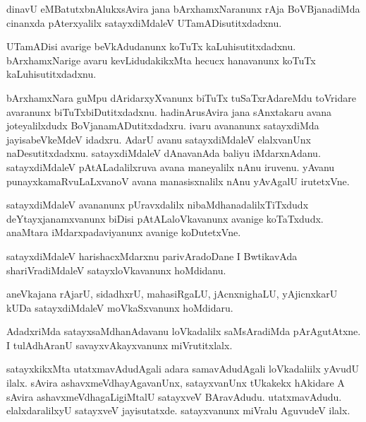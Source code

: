 \documentclass{article}
\begin{document}
\begin{mng}%
dinavU eMBatutxbnAlukxsAvira jana bArxhamxNaranunx rAja BoVBjanadiMda
cinanxda pAterxyalilx satayxdiMdaleV UTamADisutitxdadxnu.
\end{mng}

\begin{mng}%
UTamADisi avarige beVkAdudanunx koTuTx kaLuhisutitxdadxnu.
bArxhamxNarige avaru kevLidudakikxMta hecucx hanavanunx koTuTx kaLuhisutitxdadxnu.
\end{mng}

\begin{mng}%
bArxhamxNara guMpu dAridarxyXvanunx biTuTx tuSaTxrAdareMdu
toVridare avaranunx biTuTxbiDutitxdadxnu. hadinArusAvira jana sAnxtakaru
avana joteyalilxdudx BoVjanamADutitxdadxru. ivaru avananunx satayxdiMda
jayisabeVkeMdeV idadxru. AdarU avanu satayxdiMdaleV elalxvanUnx naDesutitxdadxnu. satayxdiMdaleV dAnavanAda baliyu iMdarxnAdanu. satayxdiMdaleV
pAtALadalilxruva avana maneyalilx nAnu iruvenu. yAvanu punayxkamaRvuLaLxvanoV
avana manasisxnalilx nAnu yAvAgalU irutetxVne.
\end{mng}

\begin{mng}%
satayxdiMdaleV avananunx pUravxdalilx nibaMdhanadalilxTiTxdudx deYtayxjanamxvanunx
biDisi pAtALaloVkavanunx avanige koTaTxdudx. anaMtara iMdarxpadaviyanunx avanige koDutetxVne.
\end{mng}

\begin{mng}%
satayxdiMdaleV harishacxMdarxnu parivAradoDane I BwtikavAda
shariVradiMdaleV satayxloVkavanunx hoMdidanu.
\end{mng}

\begin{mng}%
aneVkajana rAjarU, sidadhxrU, mahasiRgaLU,  jAcnxnighaLU,
yAjicnxkarU kUDa satayxdiMdaleV moVkaSxvanunx hoMdidaru.
\end{mng}

\begin{mng}%
AdadxriMda satayxsaMdhanAdavanu loVkadalilx saMsAradiMda pArAgutAtxne.
I tulAdhAranU savayxvAkayxvanunx miVrutitxlalx.
\end{mng}

\begin{mng}%
satayxkikxMta utatxmavAdudAgali adara samavAdudAgali
loVkadaliilx yAvudU ilalx. sAvira ashavxmeVdhayAgavanUnx, satayxvanUnx
tUkakekx hAkidare A sAvira ashavxmeVdhagaLigiMtalU satayxveV BAravAdudu.
utatxmavAdudu. elalxdaralilxyU satayxveV jayisutatxde. satayxvanunx miVralu
AguvudeV ilalx.
\end{mng}
\end{document}
